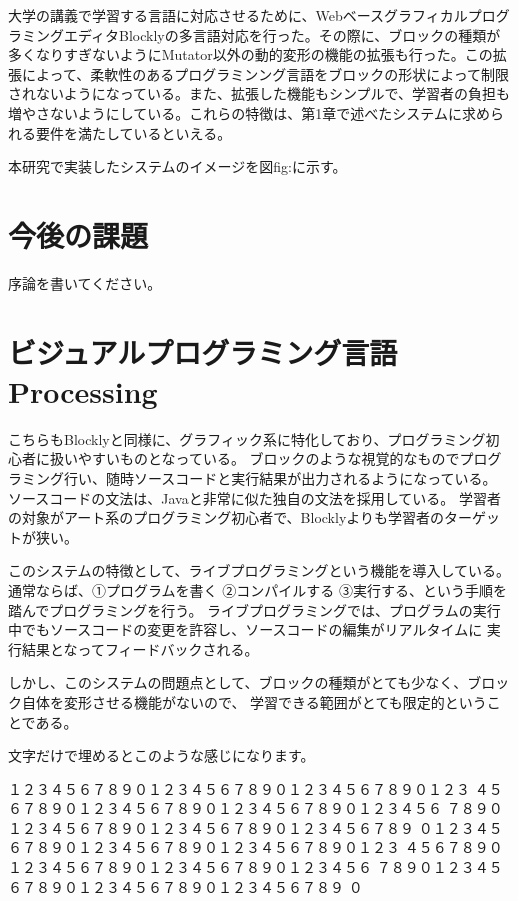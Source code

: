 \documentclass{eniepaper}
\begin{document}
大学の講義で学習する言語に対応させるために、WebベースグラフィカルプログラミングエディタBlocklyの多言語対応を行った。その際に、ブロックの種類が多くなりすぎないようにMutator以外の動的変形の機能の拡張も行った。この拡張によって、柔軟性のあるプログラミンング言語をブロックの形状によって制限されないようになっている。また、拡張した機能もシンプルで、学習者の負担も増やさないようにしている。これらの特徴は、第1章で述べたシステムに求められる要件を満たしているといえる。

本研究で実装したシステムのイメージを図{fig:}に示す。
   
   \section{今後の課題}
   
   序論を書いてください。\newpage

   \section{ビジュアルプログラミング言語 Processing}
   
こちらもBlocklyと同様に、グラフィック系に特化しており、プログラミング初心者に扱いやすいものとなっている。
 ブロックのような視覚的なものでプログラミング行い、随時ソースコードと実行結果が出力されるようになっている。
 ソースコードの文法は、Javaと非常に似た独自の文法を採用している。
 学習者の対象がアート系のプログラミング初心者で、Blocklyよりも学習者のターゲットが狭い。
 
 このシステムの特徴として、ライブプログラミングという機能を導入している。
 通常ならば、①プログラムを書く ②コンパイルする ③実行する、という手順を踏んでプログラミングを行う。
 ライブプログラミングでは、プログラムの実行中でもソースコードの変更を許容し、ソースコードの編集がリアルタイムに
 実行結果となってフィードバックされる。
 
 しかし、このシステムの問題点として、ブロックの種類がとても少なく、ブロック自体を変形させる機能がないので、
 学習できる範囲がとても限定的ということである。
 
    \newpage
 
   文字だけで埋めるとこのような感じになります。

   \noindent
   １２３４５６７８９０１２３４５６７８９０１２３４５６７８９０１２３
   ４５６７８９０１２３４５６７８９０１２３４５６７８９０１２３４５６
   ７８９０１２３４５６７８９０１２３４５６７８９０１２３４５６７８９
   ０１２３４５６７８９０１２３４５６７８９０１２３４５６７８９０１２３
   ４５６７８９０１２３４５６７８９０１２３４５６７８９０１２３４５６
   ７８９０１２３４５６７８９０１２３４５６７８９０１２３４５６７８９
   ０
\end{document}
